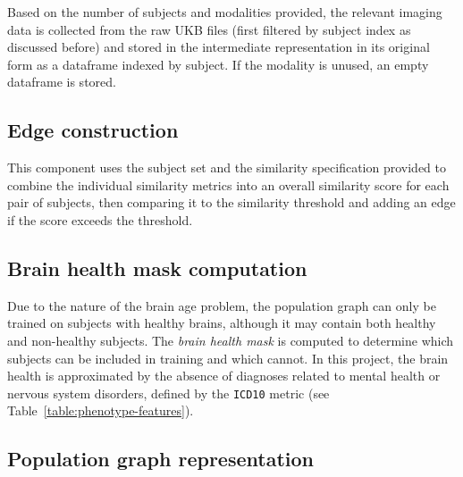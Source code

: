 Based on the number of subjects and modalities provided, the relevant imaging data is collected from the raw UKB files (first filtered by subject index as discussed before) and stored in the intermediate representation in its original form as a dataframe indexed by subject. If the modality is unused, an empty dataframe is stored.


\subsection{Edge construction}

This component uses the subject set and the similarity specification provided to combine the individual similarity metrics into an overall similarity score for each pair of subjects, then comparing it to the similarity threshold and adding an edge if the score exceeds the threshold.

\subsection{Brain health mask computation}

Due to the nature of the brain age problem, the population graph can only be trained on subjects with healthy brains, although it may contain both healthy and non-healthy subjects. The \textit{brain health mask} is computed to determine which subjects can be included in training and which cannot. In this project, the brain health is approximated by the absence of diagnoses related to mental health or nervous system disorders, defined by the \texttt{ICD10} metric (see Table~\ref{table:phenotype-features}).

\subsection{Population graph representation}

